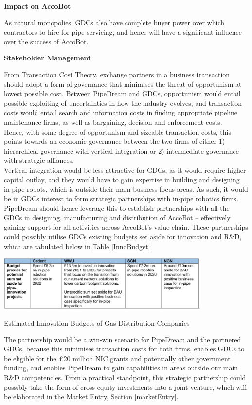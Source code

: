 \documentclass[11pt]{article}		%
\newcommand{\tableref}[1]{\hyperref[#1]{Table \ref*{#1}}}     %
\newcommand{\sectref}[1]{\hyperref[#1]{Section \ref*{#1}}}     %
\begin{document}
        \textbf{Impact on AccoBot}
        
        As natural monopolies, GDCs also have complete buyer power over which contractors to hire for pipe servicing, and hence will have a significant influence over the success of AccoBot. 
        
        \textbf{Stakeholder Management}
        
	    From Transaction Cost Theory, exchange partners in a business transaction should adopt a form of governance that minimises the threat of opportunism at lowest possible cost. Between PipeDream and GDCs, opportunism would entail possible exploiting of uncertainties in how the industry evolves, and transaction costs would entail search and information costs in finding appropriate pipeline maintenance firms, as well as bargaining, decision and enforcement costs. 
         \\ \hspace*{3ex}Hence, with some degree of opportunism and sizeable transaction costs, this points towards an economic governance between the two firms of either 1) hierarchical governance with vertical integration or 2) intermediate governance with strategic alliances. 
         \\ \hspace*{3ex}Vertical integration would be less attractive for GDCs, as it would require higher capital outlay, and they would have to gain expertise in building and designing in-pipe robots, which is outside their main business focus areas. As such, it would be in GDCs interest to form strategic partnerships with in-pipe robotics firms. 
         \\ \hspace*{3ex}PipeDream should hence leverage this to establish partnerships with all the GDCs in designing, manufacturing and distribution of AccoBot – effectively gaining support for all activities across AccoBot’s value chain.  These partnerships could possibly utilise GDCs existing budgets set aside for innovation and R\&D, which are tabulated below in \tableref{InnoBudget}. 
        \begin{table}[H]
					\centering
					\includegraphics[width=0.8\textwidth]{InnoBudget.jpg}
					\caption{Estimated Innovation Budgets of Gas Distribution Companies}
					\label{InnoBudget}
				\end{table}
		The partnership would be a win-win scenario for PipeDream and the partnered GDCs, because this minimises transaction costs for both firms, enables GDCs to be eligible for the £20 million NIC grants and potentially other government funding, and enables PipeDream to gain capabilities in areas outside our main R\&D competencies. From a practical standpoint, this strategic partnership could possibly take the form of cross-equity investments into a joint venture, which will be elaborated in the Market Entry, \sectref{marketEntry}.
		
\end{document}
